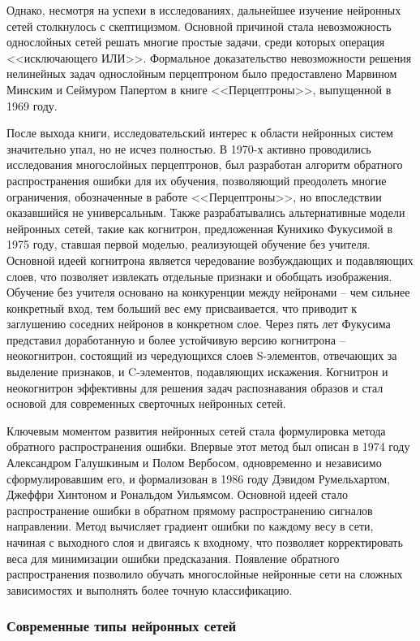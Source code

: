  Однако, несмотря на успехи в исследованиях, дальнейшее изучение нейронных сетей столкнулось с скептицизмом. Основной причиной стала невозможность однослойных сетей решать многие простые задачи, среди которых операция <<исключающего ИЛИ>>. Формальное доказательство невозможности решения нелинейных задач однослойным перцептроном было предоставлено Марвином Минским и Сеймуром Папертом в книге <<Перцептроны>>, выпущенной в 1969 году. 
 
 После выхода книги, исследовательский интерес к области нейронных систем значительно упал, но не исчез полностью. В 1970-х активно проводились исследования многослойных перцептронов, был разработан алгоритм обратного распространения ошибки для их обучения, позволяющий преодолеть многие ограничения, обозначенные в работе <<Перцептроны>>, но впоследствии оказавшийся не универсальным. Также разрабатывались альтернативные модели нейронных сетей, такие как когнитрон, предложенная Кунихико Фукусимой в 1975 году, ставшая первой моделью, реализующей обучение без учителя. Основной идеей когнитрона является чередование возбуждающих и подавляющих слоев, что позволяет извлекать отдельные признаки и обобщать изображения. Обучение без учителя основано на конкуренции между нейронами -- чем сильнее конкретный вход, тем больший вес ему присваивается, что приводит к заглушению соседних нейронов в конкретном слое. Через пять лет Фукусима представил доработанную и более устойчивую версию когнитрона -- неокогнитрон, состоящий из чередующихся слоев S-элементов, отвечающих за выделение признаков, и C-элементов, подавляющих искажения. Когнитрон и неокогнитрон эффективны для решения задач распознавания образов и стал основой для современных сверточных нейронных сетей. 
 
 Ключевым моментом развития нейронных сетей стала формулировка метода обратного распространения ошибки. Впервые этот метод был описан в 1974 году Александром Галушкиным и Полом Вербосом, одновременно и независимо сформулировавшим его, и формализован в 1986 году Дэвидом Румельхартом, Джеффри Хинтоном и Рональдом Уильямсом. Основной идеей стало распространение ошибки в обратном прямому распространению сигналов направлении. Метод вычисляет градиент ошибки по каждому весу в сети, начиная с выходного слоя и двигаясь к входному, что позволяет корректировать веса для минимизации ошибки предсказания. Появление обратного распространения позволило обучать многослойные нейронные сети на сложных зависимостях и выполнять более точную классификацию.
 
 \subsubsection{Современные типы нейронных сетей}
 
